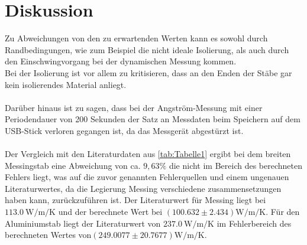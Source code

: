 \section{Diskussion}
\label{sec:Diskussion}

Zu Abweichungen von den zu erwartenden Werten kann es sowohl durch Randbedingungen, wie zum 
Beispiel die nicht ideale Isolierung, als auch durch den Einschwingvorgang bei der 
dynamischen Messung kommen. \\
Bei der Isolierung ist vor allem zu kritisieren, dass an den Enden der Stäbe gar kein 
isolierendes Material anliegt.\\
\\
Darüber hinaus ist zu sagen, dass bei der Angström-Messung mit einer Periodendauer von 
200 Sekunden der Satz an Messdaten beim Speichern auf dem USB-Stick verloren gegangen ist, 
da das Messgerät abgestürzt ist.\\
\\
Der Vergleich mit den Literaturdaten aus \autoref{tab:Tabelle1} ergibt bei dem breiten Messingstab
eine Abweichung von ca. $9,63 \%$ die nicht im Bereich des berechneten Fehlers liegt, was auf die zuvor genannten Fehlerquellen und einem
ungenauen Literaturwertes, da die Legierung Messing verschiedene zusammensetzungen haben kann, zurückzuführen ist.
Der Literaturwert für Messing liegt bei $\SI{113.0}{\watt\per\meter\per\kelvin}$ und der berechnete Wert bei $(100.632 \pm 2.434)\unit{\watt\per\meter\per\kelvin}$.
Für den Aluminiumstab liegt der Literaturwert von $\SI{237.0}{\watt\per\meter\per\kelvin}$ im Fehlerbereich des berechneten Wertes von$(249.0077 \pm 20.7677)\unit{\watt\per\meter\per\kelvin}$.
